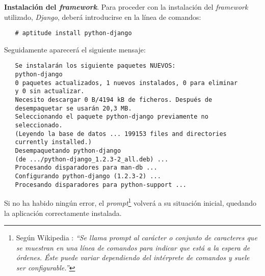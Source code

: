 \item \textbf{Instalación del \textit{framework}}.
   Para proceder con la instalación del \textit{framework} utilizado,
   \textit{Django}, deberá introducirse en la línea de comandos:

   \begin{verbatim}
   # aptitude install python-django
   \end{verbatim}

   Seguidamente aparecerá el siguiente mensaje:

   \begin{verbatim}
   Se instalarán los siguiente paquetes NUEVOS:
   python-django
   0 paquetes actualizados, 1 nuevos instalados, 0 para eliminar
   y 0 sin actualizar.
   Necesito descargar 0 B/4194 kB de ficheros. Después de
   desempaquetar se usarán 20,3 MB.
   Seleccionando el paquete python-django previamente no
   seleccionado.
   (Leyendo la base de datos ... 199153 files and directories
   currently installed.)
   Desempaquetando python-django
   (de .../python-django_1.2.3-2_all.deb) ...
   Procesando disparadores para man-db ...
   Configurando python-django (1.2.3-2) ...
   Procesando disparadores para python-support ...
   \end{verbatim}

   Si no ha habido ningún error, el \textit{prompt}\footnote{Según Wikipedia
   \cite{wikipedia2}: \textit{``Se llama prompt al carácter o conjunto de
   caracteres que se muestran en una línea de comandos para indicar que está a
   la espera de órdenes. Éste puede variar dependiendo del intérprete de
   comandos y suele ser configurable.''}} volverá a su situación inicial,
   quedando la aplicación correctamente instalada.